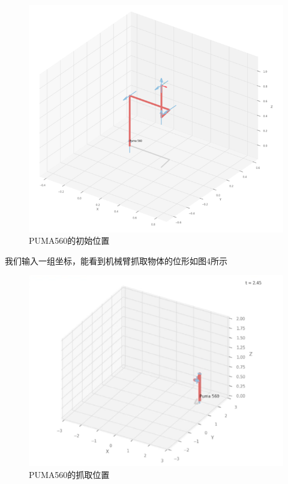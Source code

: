 \documentclass[conference]{IEEEtran}
\begin{document}
\begin{enumerate}
    \begin{figure}[htbp]
        \includegraphics[width=\linewidth]{init.png}
        \caption{PUMA560的初始位置}
    \end{figure}

    我们输入一组坐标，能看到机械臂抓取物体的位形如图4所示

    \begin{figure}[htbp]
        \includegraphics[width=\linewidth]{start.png}
        \caption{PUMA560的抓取位置}
    \end{figure}


\end{enumerate}
\end{document}
